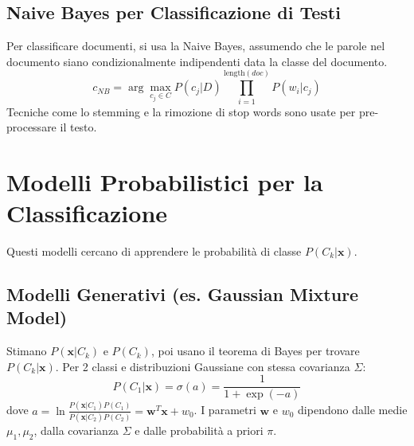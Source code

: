 \documentclass[a4paper,11pt]{article}
\begin{document}
\subsection{Naive Bayes per Classificazione di Testi}
Per classificare documenti, si usa la Naive Bayes, assumendo che le parole nel documento siano condizionalmente indipendenti data la classe del documento.
\begin{equation}
    c_{NB} = \arg\max_{c_j \in C} P(c_j | D) \prod_{i=1}^{\text{length}(doc)} P(w_i | c_j)
\end{equation}
Tecniche come lo stemming e la rimozione di stop words sono usate per pre-processare il testo.

\section{Modelli Probabilistici per la Classificazione}

Questi modelli cercano di apprendere le probabilità di classe $P(C_k | \mathbf{x})$.

\subsection{Modelli Generativi (es. Gaussian Mixture Model)}
Stimano $P(\mathbf{x}|C_k)$ e $P(C_k)$, poi usano il teorema di Bayes per trovare $P(C_k|\mathbf{x})$.
Per 2 classi e distribuzioni Gaussiane con stessa covarianza $\Sigma$:
\begin{equation}
    P(C_1 | \mathbf{x}) = \sigma(a) = \frac{1}{1 + \exp(-a)}
\end{equation}
dove $a = \ln \frac{P(\mathbf{x}|C_1)P(C_1)}{P(\mathbf{x}|C_2)P(C_2)} = \mathbf{w}^T \mathbf{x} + w_0$.
I parametri $\mathbf{w}$ e $w_0$ dipendono dalle medie $\mu_1, \mu_2$, dalla covarianza $\Sigma$ e dalle probabilità a priori $\pi$.
\end{document}
